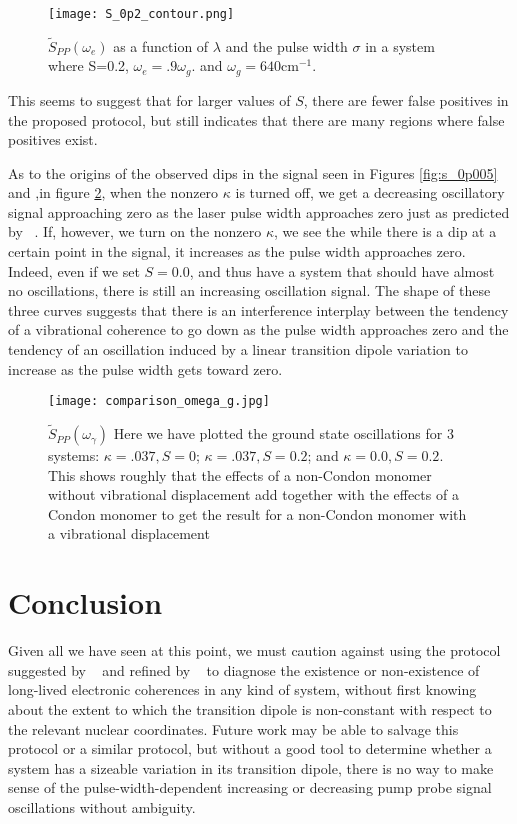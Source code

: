 \begin{figure}
   \texttt{[image: S\_0p2\_contour.png]}
   \caption{$\tilde{S}_{PP} ( \omega_e)$ as a function of $\lambda$ and the pulse width $\sigma$ in a system where S=0.2, $\omega_e = .9 \omega_g$. and $\omega_g = 640 \text{cm}^{-1}$. }
	\label{fig:s_0p2}
\end{figure}

This seems to suggest that for larger values of $S$, there are fewer false positives in the proposed protocol, but still indicates that there are many regions where false positives exist.


As to the origins of the observed dips in the signal seen in Figures \ref{fig:s_0p005} and \label{fig:s_0p2},in figure \ref{fig:addedSignals}, when the nonzero $\kappa$ is turned off, we get a decreasing oscillatory signal approaching zero as the laser pulse width approaches zero just as predicted by ~\cite{allanWitness}.  If, however, we turn on the nonzero $\kappa$, we see the while there is a dip at a certain point in the signal, it increases as the pulse width approaches zero.  Indeed, even if we set $S=0.0$, and thus have a system that should have almost no oscillations, there is still an increasing oscillation signal.  The shape of these three curves suggests that there is an interference interplay between the tendency of a vibrational coherence to go down as the pulse width approaches zero and the tendency of an oscillation induced by a linear transition dipole variation to increase as the pulse width gets toward zero.

\begin{figure}
   \texttt{[image: comparison\_omega\_g.jpg]}
   \caption{$\tilde{S}_{PP} ( \omega_{\gamma})$ Here we have plotted the ground state oscillations for 3 systems: $\kappa=.037, S=0$; $\kappa=.037, S=0.2$; and $\kappa=0.0, S=0.2$.  This shows roughly that the effects of a non-Condon monomer without vibrational displacement add together with the effects of a Condon monomer to get the result for a non-Condon monomer with a vibrational displacement}
	\label{fig:addedSignals}
\end{figure}




\section{Conclusion}

Given all we have seen at this point, we must caution against using the protocol suggested by ~\cite{witness} and refined by ~\cite{allanWitness} to diagnose the existence or non-existence of long-lived electronic coherences in any kind of system, without first knowing about the extent to which the transition dipole is non-constant with respect to the relevant nuclear coordinates.  Future work may be able to salvage this protocol or a similar protocol, but without a good tool to determine whether a system has a sizeable variation in its transition dipole, there is no way to make sense of the pulse-width-dependent increasing or decreasing pump probe signal oscillations without ambiguity.


